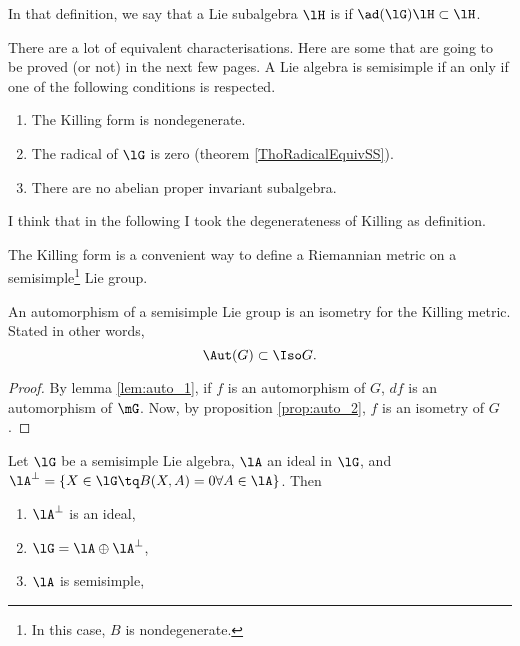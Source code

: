 In that definition, we say that a Lie subalgebra \( \lH\) is  if \( \ad(\lG)\lH\subset\lH\).

There are a lot of equivalent characterisations. Here are some that are going to be proved (or not) in the next few pages. A Lie algebra is semisimple if an only if one of the following conditions is respected.
\begin{enumerate}
    \item
        The Killing form is nondegenerate.
    \item
        The radical of \( \lG\) is zero (theorem \ref{ThoRadicalEquivSS}).
    \item
        There are no abelian proper invariant subalgebra.
\end{enumerate}

\begin{probleme}
    I think that in the following I took the degenerateness of Killing as definition.
\end{probleme}

The Killing form is a convenient way to define a Riemannian metric on a semisimple\footnote{In this case, $B$ is nondegenerate.} Lie group.

\begin{corollary}
An automorphism of a semisimple Lie group is an isometry for the Killing metric. Stated in other words,
    \begin{equation}\label{eq:Aut_Iso}
        \Aut(G)\subset\Iso G.
    \end{equation}
\end{corollary}

\begin{proof}
    By lemma \ref{lem:auto_1}, if $f$ is an automorphism of $G$, $df$ is an automorphism of $\mG$. Now, by proposition \ref{prop:auto_2}, $f$ is an isometry of $G$.
\end{proof}

\begin{proposition}
Let $\lG$ be a semisimple Lie algebra, $\lA$ an ideal in $\lG$, and $\lA^{\perp}=\{X\in\lG\tq B(X,A)=0\forall A\in\lA\}$.
Then
\begin{enumerate}
\item $\lA^{\perp}$ is an ideal,
\item $\lG=\lA\oplus\lA^{\perp}$,
\item $\lA$ is semisimple,
\end{enumerate}
\label{prop:a_aperp}
\end{proposition}

